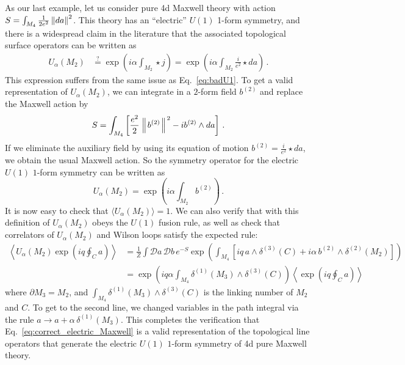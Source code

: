 \documentclass[11pt]{article}
\newcommand{\formabs}[1]{\left\Arrowvert #1 \right\Arrowvert}
\begin{document}
As our last example, let us consider pure 4d Maxwell theory with action $S = \int_{M_4} \frac{1}{2e^2} \formabs{da}^2$. This theory has an ``electric'' $U(1)$ 1-form symmetry, and there is a widespread claim in the literature that the associated topological surface operators can be written as
\begin{align}
    U_{\alpha}(M_2) &\stackrel{?}{=} 
    \exp{\left( i \alpha \int_{M_2} \star j\right)}=\exp{\left(  i \alpha \int_{M_2} \frac{i}{e^2} \star d a\right)}\,.
\end{align}
This expression suffers from the same issue as Eq.~\eqref{eq:badU1}.  To get a valid representation of $U_{\alpha}(M_2)$, we can integrate in a $2$-form field $b^{(2)}$ and replace the Maxwell action by
\begin{equation}
S = \int_{M_4} \left[\frac{e^2}{2}\formabs{b^{(2)}}^2 - i b^{(2)}\wedge da \right] \,.    
\end{equation}
If we eliminate the auxiliary field by using its equation of motion $b^{(2)} = \frac{i}{e^2}\star da$, we obtain the usual Maxwell action. So the symmetry operator for the electric $U(1)$ $1$-form symmetry can be written as
\begin{equation}
    U_\alpha(M_2) = \exp{\left(i\alpha\int_{M_2}b^{(2)}\right)}\,.
    \label{eq:correct_electric_Maxwell}
\end{equation}
 It is now easy to check that $\langle U_\alpha(M_2)\rangle = 1$.  We can also verify that with this definition of $U_\alpha(M_2)$ obeys the $U(1)$ fusion rule, as well as check that correlators of $U_\alpha(M_2)$ and Wilson loops satisfy the expected rule:
\begin{align}
    \left\langle U_\alpha(M_2) \exp{\left(i q \oint_C a\right)} \right\rangle &= \frac{1}{Z}
    \int\mathcal Da \,\mathcal Db\, 
    e^{-S} \exp\left(\int_{M_4} \left[i q\, a \wedge \delta^{(3)}(C) + i \alpha\, b^{(2)} \wedge \delta^{(2)}(M_2)\right]\right)\nonumber \\
    &=  \exp{\left(i q\alpha \int_{M_4} \delta^{(1)}(M_3)\wedge\delta^{(3)}(C)\right)}
    \left\langle \exp{\left(i q \oint_C a\right)} \right\rangle
\end{align}
where $\partial M_3 = M_2$, and $\int_{M_4} \delta^{(1)}(M_3)\wedge\delta^{(3)}(C)$ is the linking number of $M_2$ and $C$. To get to the second line, we changed variables in the path integral via the rule  $a \to a + \alpha\,\delta^{(1)}(M_3)$.   This completes the verification that Eq.~\eqref{eq:correct_electric_Maxwell} is a valid representation of the topological line operators that generate the electric $U(1)$ $1$-form symmetry of 4d pure Maxwell theory.



 
\end{document}
